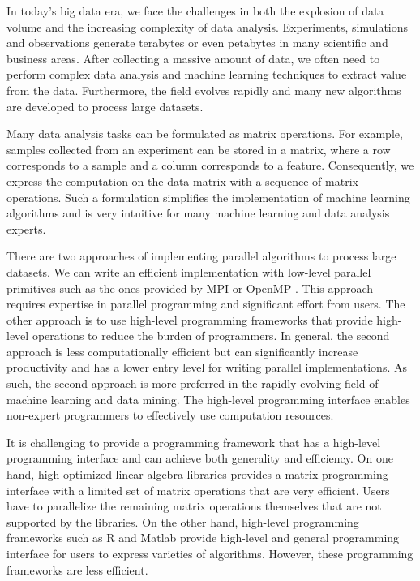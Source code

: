 
In today's big data era, we face the challenges in both the explosion of
data volume and the increasing complexity of data analysis. Experiments,
simulations and observations generate terabytes or
even petabytes in many scientific and business areas. After collecting
a massive amount of data, we often need to perform complex data analysis
and machine learning techniques to extract value from the data.
Furthermore, the field evolves rapidly and many new algorithms are developed
to process large datasets.

Many data analysis tasks can be formulated as matrix operations. For example,
samples collected from an experiment can be stored in a matrix, where a row
corresponds to a sample and a column corresponds to a feature.
Consequently, we express the computation on the data matrix with a sequence
of matrix operations. Such a formulation simplifies the implementation of
machine learning algorithms and is very intuitive for many machine learning
and data analysis experts.


There are two approaches of implementing parallel algorithms to process large
datasets. We can write an efficient implementation with low-level parallel
primitives such as the ones provided by MPI \cite{mpi} or OpenMP \cite{openmp}.
This approach requires expertise in parallel programming and significant
effort from users. The other approach is to use high-level programming
frameworks that provide high-level operations to reduce the burden of
programmers. In general, the second approach is less computationally
efficient but can significantly increase productivity and has a lower
entry level for writing parallel implementations. As such, the second approach
is more preferred in the rapidly evolving field of machine learning and data
mining. The high-level programming interface enables non-expert programmers
to effectively use computation resources.


It is challenging to provide a programming framework that has a high-level
programming interface and can achieve both generality and efficiency.
On one hand, high-optimized
linear algebra libraries \cite{mkl, openblas, elemental, trilinos, petsc}
provides a matrix programming interface with a limited set of matrix operations
that are very efficient. Users have to parallelize the remaining matrix
operations themselves that are not supported by the libraries. On the other hand,
high-level programming frameworks such as R and Matlab provide high-level and
general programming interface for users to express varieties of algorithms.
However, these programming frameworks are less efficient.

